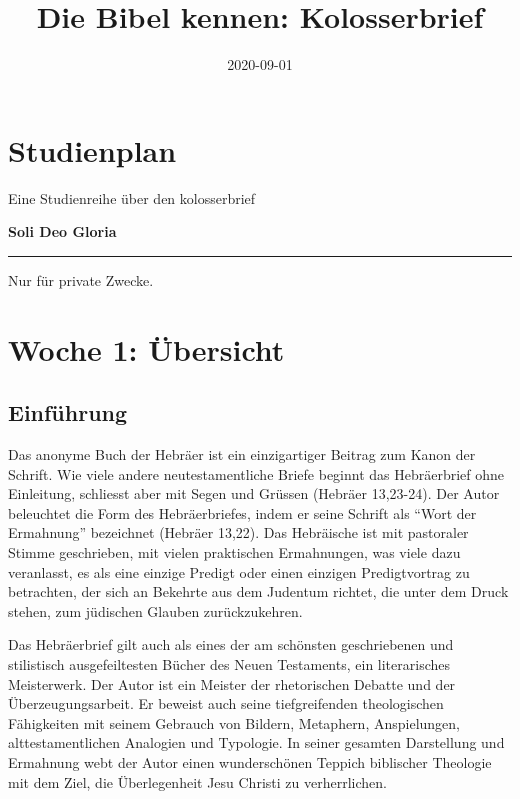 \documentclass[
  12pt,
]{krantz}
\title{Die Bibel kennen: Kolosserbrief}
\author{}
\date{\vspace{-2.5em}2020-09-01}
\makeatletter
\newenvironment{kframe}{%
\medskip{}
\setlength{\fboxsep}{.8em}
 \def\at@end@of@kframe{}%
 \ifinner\ifhmode%
  \def\at@end@of@kframe{\end{minipage}}%
  \begin{minipage}{\columnwidth}%
 \fi\fi%
 \def\FrameCommand##1{\hskip\@totalleftmargin \hskip-\fboxsep
 \colorbox{shadecolor}{##1}\hskip-\fboxsep
     \hskip-\linewidth \hskip-\@totalleftmargin \hskip\columnwidth}%
 \MakeFramed {\advance\hsize-\width
   \@totalleftmargin\z@ \linewidth\hsize
   \@setminipage}}%
 {\par\unskip\endMakeFramed%
 \at@end@of@kframe}
\newenvironment{rmdblock}[1]
  {
  \begin{itemize}
  \renewcommand{\labelitemi}{
    \raisebox{-.7\height}[0pt][0pt]{
      {\setkeys{Gin}{width=3em,keepaspectratio}\texttt{[image: img/\#1]}}
    }
  }
  \setlength{\fboxsep}{1em}
  \begin{kframe}
  \item
  }
  {
  \end{kframe}
  \end{itemize}
  }
\newenvironment{rmdinfo}
  {\begin{rmdblock}{caution}}
  {\end{rmdblock}}
\makeatother
\begin{document}
\maketitle

\thispagestyle{empty}
\mainmatter

{
\hypersetup{linkcolor=}
\setcounter{tocdepth}{2}
\tableofcontents
}
\hypertarget{studienplan}{%
\chapter{Studienplan}\label{studienplan}}

Eine Studienreihe über den kolosserbrief

\begin{rmdinfo}
\textbf{Soli Deo Gloria}
\end{rmdinfo}

\begin{center}\rule{0.5\linewidth}{0.5pt}\end{center}

Nur für private Zwecke.

\hypertarget{woche01}{%
\chapter{Woche 1: Übersicht}\label{woche01}}

\hypertarget{einfuxfchrung}{%
\section{Einführung}\label{einfuxfchrung}}

Das anonyme Buch der Hebräer ist ein einzigartiger Beitrag zum Kanon der Schrift. Wie viele andere neutestamentliche Briefe beginnt das Hebräerbrief ohne Einleitung, schliesst aber mit Segen und Grüssen ({Hebräer 13,23-24}). Der Autor beleuchtet die Form des Hebräerbriefes, indem er seine Schrift als ``Wort der Ermahnung'' bezeichnet ({Hebräer 13,22}). Das Hebräische ist mit pastoraler Stimme geschrieben, mit vielen praktischen Ermahnungen, was viele dazu veranlasst, es als eine einzige Predigt oder einen einzigen Predigtvortrag zu betrachten, der sich an Bekehrte aus dem Judentum richtet, die unter dem Druck stehen, zum jüdischen Glauben zurückzukehren.

Das Hebräerbrief gilt auch als eines der am schönsten geschriebenen und stilistisch ausgefeiltesten Bücher des Neuen Testaments, ein literarisches Meisterwerk. Der Autor ist ein Meister der rhetorischen Debatte und der Überzeugungsarbeit. Er beweist auch seine tiefgreifenden theologischen Fähigkeiten mit seinem Gebrauch von Bildern, Metaphern, Anspielungen, alttestamentlichen Analogien und Typologie. In seiner gesamten Darstellung und Ermahnung webt der Autor einen wunderschönen Teppich biblischer Theologie mit dem Ziel, die Überlegenheit Jesu Christi zu verherrlichen.
\end{document}
